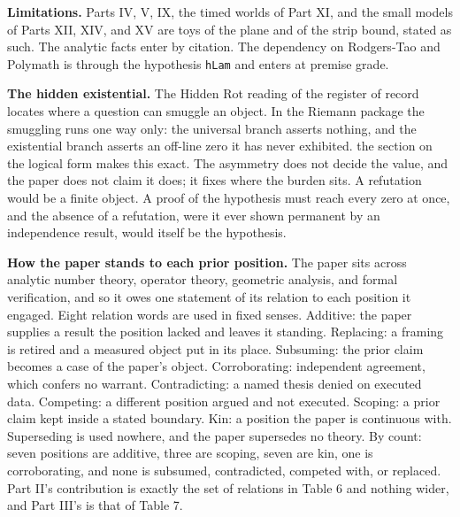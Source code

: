 \documentclass[10pt]{article}
\begin{document}
\textbf{Limitations.} Parts IV, V, IX, the timed worlds of Part XI, and
the small models of Parts XII, XIV, and XV are toys of the plane and of
the strip bound, stated as such. The analytic facts enter by citation.
The dependency on Rodgers-Tao and Polymath is through the hypothesis
\texttt{hLam} and enters at premise grade.

\textbf{The hidden existential.} The Hidden Rot reading of the register
of record locates where a question can smuggle an object. In the Riemann
package the smuggling runs one way only: the universal branch asserts
nothing, and the existential branch asserts an off-line zero it has
never exhibited. the section on the logical form makes this exact. The
asymmetry does not decide the value, and the paper does not claim it
does; it fixes where the burden sits. A refutation would be a finite
object. A proof of the hypothesis must reach every zero at once, and the
absence of a refutation, were it ever shown permanent by an independence
result, would itself be the hypothesis.

\textbf{How the paper stands to each prior position.} The paper sits
across analytic number theory, operator theory, geometric analysis, and
formal verification, and so it owes one statement of its relation to
each position it engaged. Eight relation words are used in fixed senses.
Additive: the paper supplies a result the position lacked and leaves it
standing. Replacing: a framing is retired and a measured object put in
its place. Subsuming: the prior claim becomes a case of the paper's
object. Corroborating: independent agreement, which confers no warrant.
Contradicting: a named thesis denied on executed data. Competing: a
different position argued and not executed. Scoping: a prior claim kept
inside a stated boundary. Kin: a position the paper is continuous with.
Superseding is used nowhere, and the paper supersedes no theory. By
count: seven positions are additive, three are scoping, seven are kin,
one is corroborating, and none is subsumed, contradicted, competed with,
or replaced. Part II's contribution is exactly the set of relations in
Table 6 and nothing wider, and Part III's is that of Table 7.
\end{document}
